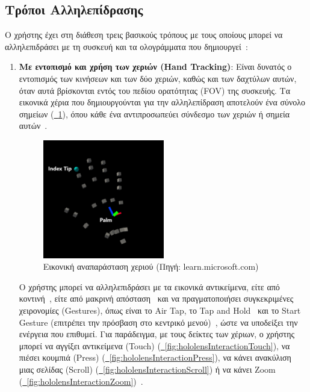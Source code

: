 \subsection{Τρόποι Αλληλεπίδρασης}\label{subsec:hololensInteraction}
Ο χρήστης έχει στη διάθεση τρεις βασικούς τρόπους με τους οποίους μπορεί να αλληλεπιδράσει με τη συσκευή και τα ολογράμματα που δημιουργεί~\cite{scooley_2023_hololens}:
\begin{enumerate}
    \item \textbf{Με εντοπισμό και χρήση των χεριών (Hand Tracking)}: Είναι δυνατός ο εντοπισμός των κινήσεων και των δύο χεριών, καθώς και των δαχτύλων αυτών, όταν αυτά βρίσκονται εντός του πεδίου ορατότητας (FOV) της συσκευής. Τα εικονικά χέρια που δημιουργούνται για την αλληλεπίδραση αποτελούν ένα σύνολο σημείων (\hyperref[fig:handRepresentation]{\schema~\ref*{fig:handRepresentation}}), όπου κάθε ένα αντιπροσωπεύει σύνδεσμο των χεριών ή σημεία αυτών~\cite{keveleigh_2022_hand}.
    
    \begin{figure}[!hb]
        \centering
        \includegraphics[width=0.5\textwidth]{images/holographic_hand.png}
        \caption[Εικονική αναπαράσταση χεριού]{Εικονική αναπαράσταση χεριού {\footnotesize (Πηγή: learn.microsoft.com)}}\label{fig:handRepresentation}
    \end{figure}
    
    Ο χρήστης μπορεί να αλληλεπιδράσει με τα εικονικά αντικείμενα, είτε από κοντινή~\cite{caseymeekhof_2022_direct}, είτε από μακρινή απόσταση~\cite{caseymeekhof_2022_point} και να πραγματοποιήσει συγκεκριμένες χειρονομίες (Gestures), όπως είναι το Air Tap, το Tap and Hold~\cite{sostel_2023_gaze} και το Start Gesture (επιτρέπει την πρόσβαση στο κεντρικό μενού)~\cite{shengkait_2022_start}, ώστε να υποδείξει την ενέργεια που επιθυμεί. Για παράδειγμα, με τους δείκτες των χέριων, ο χρήστης μπορεί να αγγίξει αντικείμενα (Touch) (\hyperref[fig:hololensInteractionTouch]{\schema~\ref*{fig:hololensInteractionTouch}}), να πιέσει κουμπιά (Press) (\hyperref[fig:hololensInteractionPress]{\schema~\ref*{fig:hololensInteractionPress}}), να κάνει ανακύλιση μιας σελίδας (Scroll) (\hyperref[fig:hololensInteractionScroll]{\schema~\ref*{fig:hololensInteractionScroll}}) ή να κάνει Zoom (\hyperref[fig:hololensInteractionZoom]{\schema~\ref*{fig:hololensInteractionZoom}})~\cite{caseymeekhof_2022_direct}.
    

\end{enumerate}
